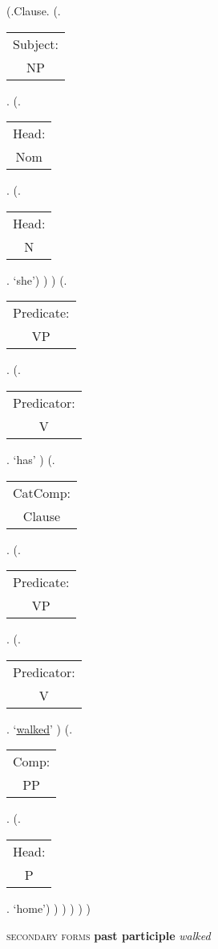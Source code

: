 \documentclass[12pt,letterpaper]{article}
\begin{document}
\begin{figure}
	\begin{center}
		\begin{parsetree}
			(.Clause.
			(.\begin{tabular}{c}Subject:\\NP\end{tabular}.  
			(.\begin{tabular}{c}Head:\\Nom\end{tabular}.
			(.\begin{tabular}{c}Head:\\N\end{tabular}. `she')
			)
			)
			(.\begin{tabular}{c}Predicate:\\VP\end{tabular}.
			(.\begin{tabular}{c}Predicator:\\V\end{tabular}.    `has' )
			(.\begin{tabular}{c}CatComp:\\Clause\end{tabular}. 
			(.\begin{tabular}{c}Predicate:\\VP\end{tabular}.
			(.\begin{tabular}{c}Predicator:\\V\end{tabular}.    `\underline{walked}' )
			(.\begin{tabular}{c}Comp:\\PP\end{tabular}. 
			(.\begin{tabular}{c}Head:\\P\end{tabular}. `home')
			)
			)
			)
			)
			) 
			
		\end{parsetree}
		\hfill \break \hfill {} \textsc{secondary forms} \textbf{past participle} \textit{walked}
	\end{center}
\end{figure}
\end{document}
